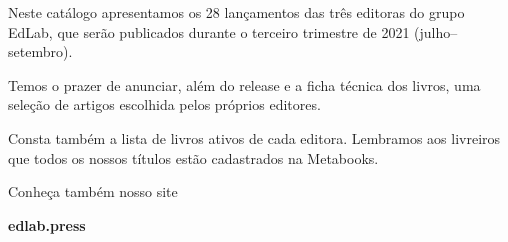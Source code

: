 
\hspace*{-7cm}\hrulefill\hspace*{-7cm}

\vspace{1cm}

\hspace*{-.5cm}\parbox{180pt}{\raggedright 
Neste catálogo apresentamos os 28
lançamentos das três editoras do grupo EdLab, que serão publicados durante o
terceiro trimestre de 2021 (julho--setembro). 

Temos o prazer de anunciar, além do release e a ficha técnica dos livros, uma 
seleção de artigos escolhida pelos próprios editores. 

Consta também a lista de 
livros ativos de cada editora. Lembramos aos livreiros que todos os nossos títulos
estão cadastrados na Metabooks.

Conheça também nosso site

\textbf{edlab.press}
} %


